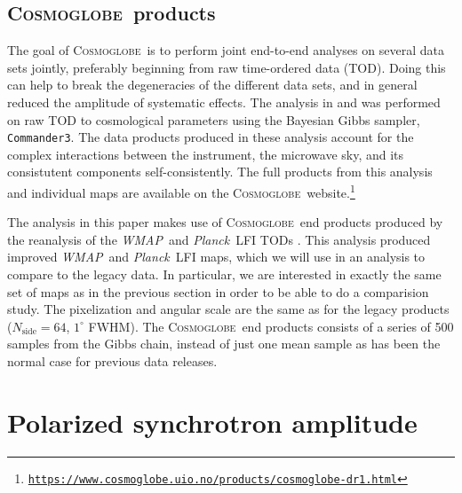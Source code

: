 \documentclass[twocolumn]{../../common/aa}
\def\WMAP{\emph{WMAP}}
\def\Planck{\emph{Planck}}
\def\commanderthree{\texttt{Commander3}}
\newcommand{\cosmoglobe}{\textsc{Cosmoglobe}}
\newcommand{\Cosmoglobe}{\textsc{Cosmoglobe}}
\begin{document}
\subsection{\Cosmoglobe\ products}
\label{sec:cosmoglobe_data}

The goal of \Cosmoglobe\ is to perform joint end-to-end analyses on several data sets jointly, preferably beginning from raw time-ordered data (TOD). Doing this can help to break the degeneracies of the different data sets, and in general reduced the amplitude of systematic effects. The analysis in \citet{bp01} and \citet{watts2023_dr1} was performed on raw TOD to cosmological parameters using the Bayesian Gibbs sampler, \commanderthree. The data products produced in these analysis account for the complex interactions between the instrument, the microwave sky, and its consistutent components self-consistently. The full products from this analysis and individual maps are available on the \cosmoglobe\ website.\footnote{\href{https://www.cosmoglobe.uio.no/products/cosmoglobe-dr1.html}{\texttt{https://www.cosmoglobe.uio.no/products/\newline cosmoglobe-dr1.html}}}

The analysis in this paper makes use of \cosmoglobe\ end products produced by the reanalysis of the \WMAP\ and \Planck\ LFI TODs \citep{watts2023_dr1}. This analysis produced improved \WMAP\ and \Planck\ LFI maps, which we will use in an analysis to compare to the legacy data. In particular, we are interested in exactly the same set of maps as in the previous section in order to be able to do a comparision study. The pixelization and angular scale are the same as for the legacy products ($N_\textrm{side}=64$, $1^\circ$ FWHM). The \cosmoglobe\ end products consists of a series of 500 samples from the Gibbs chain, instead of just one mean sample as has been the normal case for previous data releases.


\section{Polarized synchrotron amplitude}



\end{document}
